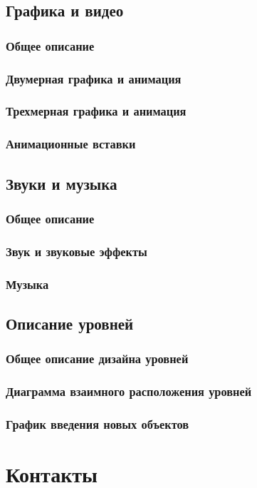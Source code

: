 \documentclass{article}
\begin{document}
	\subsection{Графика и видео}
	
	\subsubsection{Общее описание}
	
	\subsubsection{Двумерная графика и анимация}
	
	\subsubsection{Трехмерная графика и анимация}
	
	\subsubsection{Анимационные вставки}
	
	\subsection{Звуки и музыка}
	
	\subsubsection{Общее описание}
	
	\subsubsection{Звук и звуковые эффекты}
	
	\subsubsection{Музыка}
	
	\subsection{Описание уровней}
	
	\subsubsection{Общее описание дизайна уровней}
	
	\subsubsection{Диаграмма взаимного расположения уровней}
	
	\subsubsection{График введения новых объектов}
	
	\newpage
	\section{Контакты}
	
	\newpage
	
\end{document}
